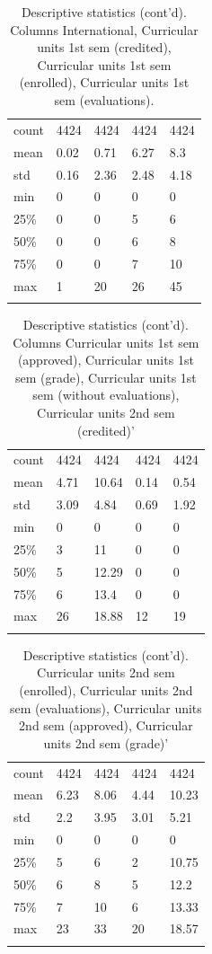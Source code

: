 \documentclass[
  letterpaper,
  DIV=11,
  numbers=noendperiod]{scrartcl}
\begin{document}
\hypertarget{tbl-descstat-5}{}
\begin{longtable}[]{@{}lllll@{}}
\toprule\noalign{}
\endfirsthead
\endhead
\bottomrule\noalign{}
\endlastfoot
count & 4424 & 4424 & 4424 & 4424 \\
mean & 0.02 & 0.71 & 6.27 & 8.3 \\
std & 0.16 & 2.36 & 2.48 & 4.18 \\
min & 0 & 0 & 0 & 0 \\
25\% & 0 & 0 & 5 & 6 \\
50\% & 0 & 0 & 6 & 8 \\
75\% & 0 & 0 & 7 & 10 \\
max & 1 & 20 & 26 & 45 \\
\caption{\label{tbl-descstat-5}Descriptive statistics (cont'd). Columns
International, Curricular units 1st sem (credited), Curricular units 1st
sem (enrolled), Curricular units 1st sem (evaluations).}\tabularnewline
\end{longtable}

\hypertarget{tbl-descstat-6}{}
\begin{longtable}[]{@{}lllll@{}}
\toprule\noalign{}
\endfirsthead
\endhead
\bottomrule\noalign{}
\endlastfoot
count & 4424 & 4424 & 4424 & 4424 \\
mean & 4.71 & 10.64 & 0.14 & 0.54 \\
std & 3.09 & 4.84 & 0.69 & 1.92 \\
min & 0 & 0 & 0 & 0 \\
25\% & 3 & 11 & 0 & 0 \\
50\% & 5 & 12.29 & 0 & 0 \\
75\% & 6 & 13.4 & 0 & 0 \\
max & 26 & 18.88 & 12 & 19 \\
\caption{\label{tbl-descstat-6}Descriptive statistics (cont'd). Columns
Curricular units 1st sem (approved), Curricular units 1st sem (grade),
Curricular units 1st sem (without evaluations), Curricular units 2nd sem
(credited)'}\tabularnewline
\end{longtable}

\hypertarget{tbl-descstat-7}{}
\begin{longtable}[]{@{}lllll@{}}
\toprule\noalign{}
\endfirsthead
\endhead
\bottomrule\noalign{}
\endlastfoot
count & 4424 & 4424 & 4424 & 4424 \\
mean & 6.23 & 8.06 & 4.44 & 10.23 \\
std & 2.2 & 3.95 & 3.01 & 5.21 \\
min & 0 & 0 & 0 & 0 \\
25\% & 5 & 6 & 2 & 10.75 \\
50\% & 6 & 8 & 5 & 12.2 \\
75\% & 7 & 10 & 6 & 13.33 \\
max & 23 & 33 & 20 & 18.57 \\
\caption{\label{tbl-descstat-7}Descriptive statistics (cont'd).
Curricular units 2nd sem (enrolled), Curricular units 2nd sem
(evaluations), Curricular units 2nd sem (approved), Curricular units 2nd
sem (grade)'}\tabularnewline
\end{longtable}
\end{document}
